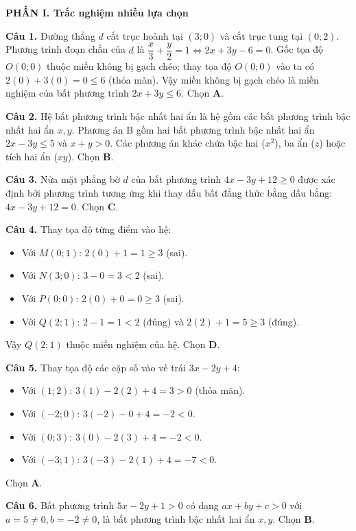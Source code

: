 \documentclass[12pt,a4paper]{article}
\begin{document}
\textbf{\large PHẦN I. Trắc nghiệm nhiều lựa chọn}

\textbf{Câu 1.} Đường thẳng $d$ cắt trục hoành tại $(3; 0)$ và cắt trục tung tại $(0; 2)$. Phương trình đoạn chắn của $d$ là $\dfrac{x}{3} + \dfrac{y}{2} = 1 \iff 2x + 3y - 6 = 0$. Gốc tọa độ $O(0; 0)$ thuộc miền không bị gạch chéo; thay tọa độ $O(0; 0)$ vào ta có $2(0) + 3(0) = 0 \le 6$ (thỏa mãn). Vậy miền không bị gạch chéo là miền nghiệm của bất phương trình $2x + 3y \le 6$. Chọn \textbf{A}.

\textbf{Câu 2.} Hệ bất phương trình bậc nhất hai ẩn là hệ gồm các bất phương trình bậc nhất hai ẩn $x, y$. Phương án B gồm hai bất phương trình bậc nhất hai ẩn $2x - 3y \le 5$ và $x + y > 0$. Các phương án khác chứa bậc hai ($x^2$), ba ẩn ($z$) hoặc tích hai ẩn ($xy$). Chọn \textbf{B}.

\textbf{Câu 3.} Nửa mặt phẳng bờ $d$ của bất phương trình $4x - 3y + 12 \ge 0$ được xác định bởi phương trình tương ứng khi thay dấu bất đẳng thức bằng dấu bằng: $4x - 3y + 12 = 0$. Chọn \textbf{C}.

\textbf{Câu 4.} Thay tọa độ từng điểm vào hệ:
\begin{itemize}[leftmargin=0.5cm, itemsep=1pt, topsep=1pt]
    \item Với $M(0; 1)$: $2(0) + 1 = 1 \ge 3$ (sai).
    \item Với $N(3; 0)$: $3 - 0 = 3 < 2$ (sai).
    \item Với $P(0; 0)$: $2(0) + 0 = 0 \ge 3$ (sai).
    \item Với $Q(2; 1)$: $2 - 1 = 1 < 2$ (đúng) và $2(2) + 1 = 5 \ge 3$ (đúng).
\end{itemize}
Vậy $Q(2; 1)$ thuộc miền nghiệm của hệ. Chọn \textbf{D}.

\textbf{Câu 5.} Thay tọa độ các cặp số vào vế trái $3x - 2y + 4$:
\begin{itemize}[leftmargin=0.5cm, itemsep=1pt, topsep=1pt]
    \item Với $(1; 2)$: $3(1) - 2(2) + 4 = 3 > 0$ (thỏa mãn).
    \item Với $(-2; 0)$: $3(-2) - 0 + 4 = -2 < 0$.
    \item Với $(0; 3)$: $3(0) - 2(3) + 4 = -2 < 0$.
    \item Với $(-3; 1)$: $3(-3) - 2(1) + 4 = -7 < 0$.
\end{itemize}
Chọn \textbf{A}.

\textbf{Câu 6.} Bất phương trình $5x - 2y + 1 > 0$ có dạng $ax + by + c > 0$ với $a = 5 \ne 0, b = -2 \ne 0$, là bất phương trình bậc nhất hai ẩn $x, y$. Chọn \textbf{B}.
\end{document}
